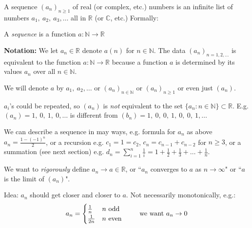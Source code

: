 \setcounter{lecture}{1}

\label{sub:sequences}

A sequence $(a_n)_{n\geq 1}$ of real (or complex, etc.) numbers is an infinite list of numbers $a_1,~a_2,~a_3,\dots$ all in $\mathbb{R}$ (or $\mathbb{C}$, etc.) Formally:\\

\begin{definition}
	A \emph{sequence} is a function $a:\mathbb{N} \to \mathbb{R}$
\end{definition}

\textbf{Notation:} We let $a_n \in \mathbb{R}$ denote $a(n)$ for $n \in \mathbb{N}$. The data $(a_n)_{n=1,2,\dots}$ is equivalent to the function $a:\mathbb{N} \to \mathbb{R}$ because a function $a$ is determined by its values $a_n$ over all $n \in \mathbb{N}$. 

We will denote $a$ by $a_1,~a_2,\dots$ or $(a_n)_{n\in\mathbb{N}}$ or $(a_n)_{n\geq 1}$ or even just $(a_n)$.

\begin{remark}
$a_i$'s could be repeated, so $(a_n)$ is \emph{not} equivalent to the set $\{a_n : n \in \mathbb{N}\}\subset \mathbb{R}$. E.g. $(a_n) = 1,~0,~1,~0,\dots$ is different from $(b_n) = 1,~0,~0,~1,~0,~0,~1,\dots$	
\end{remark}

We can describe a sequence in may ways, e.g. formula for $a_n$ as above $a_n = \frac{1-(-1)^n}{2}$, or a recursion e.g. $c_1 = 1 = c_2$, $c_n = c_{n-1} + c_{n-2}$ for $n\geq 3$, or a summation (see next section) e.g. $d_n = \sum_{i=1}^n \frac{1}{i} = 1 + \frac{1}{2} + \frac{1}{3} + \dots +\frac{1}{n}$.

We want to \emph{rigorously} define $a_n \to a \in \mathbb{R}$, or ``$a_n$ converges to $a$ as $n \to \infty$" or ``$a$ is the limit of $(a_n)$". 

Idea: $a_n$ should get closer and closer to $a$. Not necessarily monotonically, e.g.:
\[a_n = 
\begin{cases}
\frac{1}{n} & n \text{ odd}\\
\frac{1}{2n} & n \text{ even}	
\end{cases}
\hspace*{20pt}\text{ we want } a_n \to 0\]


